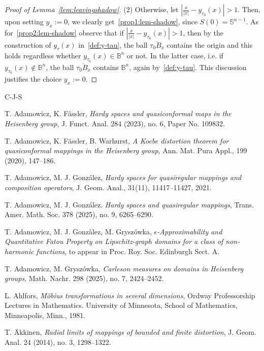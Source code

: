 \documentclass[11pt,a4paper,reqno]{amsart}
\theoremstyle{definition}
\newcommand{\ep}{\epsilon}
\newcommand{\B}{\mathbb{B}^n}
\newcommand{\Sn}{\mathbb{S}^{n-1}}
\numberwithin{komcounter}{section}
\begin{document}
\begin{appendix}
\begin{proof}[Proof of Lemma~\ref{lem:leavingshadow}]
\noindent (2) Otherwise, let $\left|\frac{x}{|x|}-y_{\tau_0}(x)\right|> 1$. Then, upon setting $y_x:=0$, we clearly get~\eqref{prop1:lem-shadow}, since $S(0)=\Sn$. As for~\eqref{prop2:lem-shadow} observe that if $\left|\frac{x}{|x|}-y_{\tau_0}(x)\right|>1$, then by the construction of $y_\tau(x)$ in~\eqref{def:y-tau}, the ball $\overline{\tau_0 B_x}$ contains the origin and this holds regardless whether $y_{\tau_0}(x)\in \B$ or not. In the latter case, i.e. if $y_{\tau_0}(x)\notin \B$, the ball $\overline{\tau_0B_x}$ contains $\B$, again by~\eqref{def:y-tau}. This discussion justifies the choice $y_x:=0$.
\end{proof}
\end{appendix}




\begin{thebibliography}{C-J-S}

 T. Adamowicz, K. F\"assler, \emph{Hardy spaces and quasiconformal maps in the Heisenberg group}, J. Funct. Anal. 284 (2023), no. 6, Paper No. 109832. 

 T. Adamowicz, K. F\"assler, B. Warhurst, \emph{A Koebe distortion theorem for quasiconformal mappings in the Heisenberg group}, Ann. Mat. Pura Appl., 199 (2020), 147--186.

 T. Adamowicz, M. J. Gonz\'{a}lez, \emph{Hardy spaces for quasiregular mappings and composition operators}, J. Geom. Anal., 31(11), 11417--11427, 2021.

 T. Adamowicz, M. J. Gonz\'{a}lez. \emph{Hardy spaces and quasiregular mappings}, Trans. Amer. Math. Soc. 378 (2025), no. 9, 6265--6290.

 T. Adamowicz, M. J. Gonz\`alez, M. Grysz\'owka, \emph{$\ep$-Approximability and Quantitative Fatou Property on Lipschitz-graph domains for a class of non-harmonic functions}, to appear in Proc. Roy. Soc. Edinburgh Sect. A.

 T. Adamowicz, M. Grysz\'owka, \emph{Carleson measures on domains in Heisenberg groups}, Math. Nachr. 298 (2025), no. 7, 2424--2452.

 L. Ahlfors, \emph{M\"obius transformations in several dimensions}, Ordway Professorship Lectures in Mathematics. University of Minnesota, School of Mathematics, Minneapolis, Minn., 1981.

 T. \"Akkinen, \emph{Radial limits of mappings of bounded and finite distortion}, J. Geom. Anal. 24 (2014), no. 3, 1298--1322.


\end{thebibliography}
\end{document}
